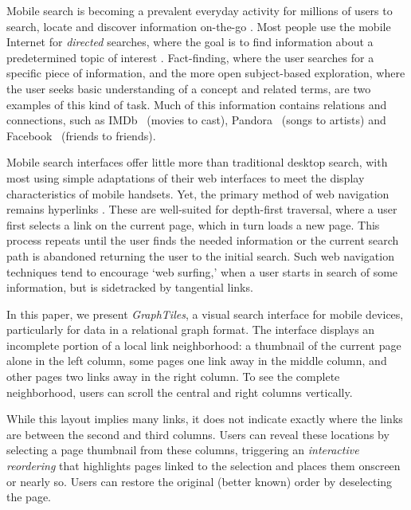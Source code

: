 Mobile search is becoming a prevalent everyday activity for millions of users to search, locate and discover information on-the-go \cite{Church:2011}. Most people use the mobile Internet for \textit{directed} searches, where the goal is to find information about a predetermined topic of interest \cite{1143118}. Fact-finding, where the user searches for a specific piece of information, and the more open subject-based exploration, where the user seeks basic understanding of a concept and related terms, are two examples of this kind of task. Much of this information contains relations and connections, such as IMDb~\cite{imdb} (movies to cast), Pandora~\cite{pandora} (songs to artists) and Facebook~\cite{Facebook} (friends to friends). 


Mobile search interfaces offer little more than traditional desktop search, with most using simple adaptations of their web interfaces to meet the display characteristics of
mobile handsets. Yet, the primary method of web navigation remains hyperlinks \cite{206540}.  These are well-suited for depth-first traversal, where a user first selects a link on the current page, which in turn loads a new page. This process repeats until the user finds the needed information or the current search path is abandoned returning the user to the initial search. Such web navigation techniques tend to encourage `web surfing,' when a user starts in search of some information, but is sidetracked by tangential links.

In this paper, we present \textit{GraphTiles}, a visual search interface for mobile devices, particularly for data in a relational graph format. The interface displays an incomplete portion of a local link neighborhood: a thumbnail of the current page alone in the left column, some pages one link away in the middle column, and other pages two links away in the right column. To see the complete neighborhood, users can scroll the central and right columns vertically.

While this layout implies many links, it does not indicate exactly where the links are between the second and third columns. Users can reveal these locations by selecting a page thumbnail from these columns, triggering an \textit{interactive reordering} that highlights pages linked to the selection and places them onscreen or nearly so. Users can restore the original (better known) order by deselecting the page.


